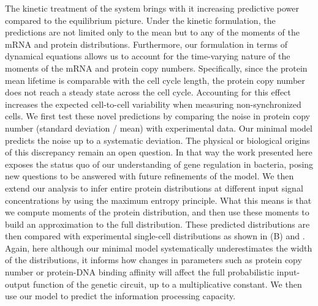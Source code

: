 The kinetic treatment of the system brings with it increasing predictive power
compared to the equilibrium picture. Under the kinetic formulation, the
predictions are not limited only to the mean but to any of the moments of the
mRNA and protein distributions. Furthermore, our formulation in terms of
dynamical equations allows us to account for the time-varying nature of the
moments of the mRNA and protein copy numbers. Specifically, since the protein
mean lifetime is comparable with the cell cycle length, the protein copy number
does not reach a steady state across the cell cycle. Accounting for this effect
increases the expected cell-to-cell variability when measuring non-synchronized
cells. We first test these novel predictions by comparing the noise in protein
copy number (standard deviation / mean) with experimental data. Our minimal
model predicts the noise up to a systematic deviation. The physical or
biological origins of this discrepancy remain an open question. In that way the
work presented here exposes the status quo of our understanding of gene
regulation in bacteria, posing new questions to be answered with future
refinements of the model. We then extend our analysis to infer entire protein
distributions at different input signal concentrations by using the maximum
entropy principle. What this means is that we compute moments of the protein
distribution, and then use these moments to build an approximation to the full
distribution. These predicted distributions are then compared with experimental
single-cell distributions as shown in (B) and
. Again, here although our minimal model systematically
underestimates the width of the distributions, it informs how changes in
parameters such as protein copy number or protein-DNA binding affinity will
affect the full probabilistic input-output function of the genetic circuit, up
to a multiplicative constant. We then use our model to predict the information
processing capacity.

